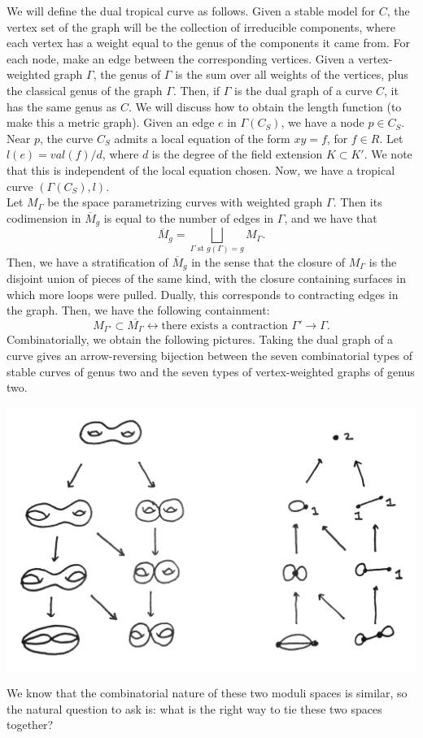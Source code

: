 We will define the dual tropical curve as follows. Given a stable model for $C$, the vertex set of the graph will be the collection of irreducible components, where each vertex has a weight equal to the genus of the components it came from. For each node, make an edge between the corresponding vertices. Given a vertex-weighted graph $\Gamma$, the genus of $\Gamma$ is the sum over all weights of the vertices, plus the classical genus of the graph $\Gamma$. Then, if $\Gamma$ is the dual graph of a curve $C$, it has the same genus as $C$. We will discuss how to obtain the length function (to make this a metric graph).
Given an edge $e$ in $\Gamma(C_S)$, we have a node $p \in C_S$. Near $p$, the curve $C_S$ admits a local equation of the form $xy=f$, for $f \in R$. Let $l(e) = val(f)/d$, where $d$ is the degree of the field extension $K \subset K'$. We note that this is independent of the local equation chosen. Now, we have a tropical curve $(\Gamma(C_S), l)$. \\

 Let $M_{\Gamma}$ be the space parametrizing curves with weighted graph $\Gamma$. Then its codimension in $\overline{M}_g$ is equal to the number of edges in $\Gamma$, and we have that
$$
\overline{M}_g = \bigsqcup_{\Gamma\text{ st }g(\Gamma)=g} M_\Gamma.
$$
Then, we have a stratification of $\overline{M}_g$ in the sense that the closure of $M_{\Gamma}$ is the disjoint union of pieces of the same kind, with the closure containing surfaces in which more loops were pulled. Dually, this corresponds to contracting edges in the graph. Then, we have the following containment:
$$
M_{\Gamma'} \subset \overline{M_\Gamma} \leftrightarrow \text{there exists a contraction $\Gamma' \rightarrow \Gamma$}.
$$
Combinatorially, we obtain the following pictures. Taking the dual graph of a curve gives an arrow-reversing bijection between the seven combinatorial types of stable curves of genus two and the seven types of vertex-weighted graphs of genus two.
\begin{center}
  \includegraphics[width=.9\linewidth]{../Curves/ex-2-madeline-brandt/bijection}
\end{center}
We know that the combinatorial nature of these two moduli spaces is similar, so the natural question to ask is: what is the right way to tie these two spaces together?

